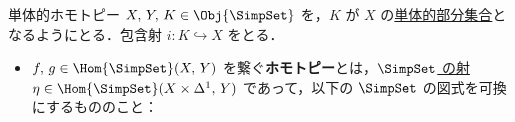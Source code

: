 \documentclass[TQFT_main]{subfiles}
\begin{document}
\begin{mydef}[label=def:SimpSet-homotopic,breakable]{単体的ホモトピー}
    $X,\, Y,\, K\in \Obj{\SimpSet}$ を，$K$ が $X$ の\hyperref[def:SimpSet]{単体的部分集合}となるようにとる．包含射 $i \colon K \hookrightarrow X$ をとる．
    \begin{itemize}
        \item 
        $f,\, g \in \Hom{\SimpSet} (X,\, Y)$ を繋ぐ\textbf{ホモトピー}とは，\hyperref[def:SimpSet]{$\SimpSet$ の射} $\eta \in \Hom{\SimpSet}(X \times \Delta^1,\, Y)$ であって，以下の $\SimpSet$ の図式を可換にするもののこと：
        \begin{center}

\end{center}
\end{itemize}
\end{mydef}
\end{document}
